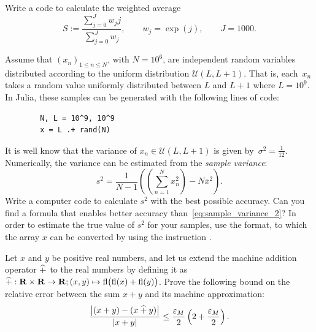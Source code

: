 \begin{exercise}
    Write a code to calculate the weighted average
    \[
        S := \frac
        {\sum_{j=0}^{J} w_j j}
        {\sum_{j=0}^{J} w_j},
        \qquad w_j = \exp(j),
        \qquad J = 1000.
    \]
\end{exercise}

\begin{exercise}
    Assume that $(x_n)_{1 \leq n \leq N}$, with $N = 10^6$, are independent random variables distributed according to
    the uniform distribution $\mathcal U(L, L+1)$.
    That is, each~$x_n$ takes a random value uniformly distributed between $L$ and $L+1$ where $L = 10^9$.
    In Julia, these samples can be generated with the following lines of code:
    \begin{verbatim}
        N, L = 10^9, 10^9
        x = L .+ rand(N)
    \end{verbatim}
    It is well know that the variance of $x_n \in \mathcal U(L, L+1)$ is given by~$\sigma^2 = \frac{1}{12}$.
    Numerically, the variance can be estimated from the \emph{sample variance}:
    \begin{equation}
        \label{eq:sample_variance_2}
        s^2 = \frac{1}{N-1} \left(\left(\sum_{n=1}^{N} x_n^2\right) - N \bar x^2 \right).
    \end{equation}
    Write a computer code to calculate $s^2$ with the best possible accuracy.
    Can you find a formula that enables better accuracy than~\eqref{eq:sample_variance_2}?
    In order to estimate the true value of $s^2$ for your samples,
    use the  format,
    to which the array $x$ can be converted by using the instruction .
\end{exercise}

\begin{exercise}
    Let $x$ and $y$ be positive real numbers,
    and let us extend the machine addition operator $\mathbin{\widehat +}$ to the real numbers by defining it as $\mathbin{\widehat +}: \mathbf R \times \mathbf R \to \mathbf R; (x, y) \mapsto {\rm fl} \bigl({\rm fl}(x) + {\rm fl}(y)\bigr)$.
    Prove the following bound on the relative error between the sum $x+y$ and its machine approximation:
    \[
        \frac{\bigl| (x + y) - (x \mathbin{\widehat +}  y ) \bigr|}{|x + y|}
        \leq \frac{\varepsilon_M}{2}  \left(2 + \frac{\varepsilon_M}{2}\right).
    \]
\end{exercise}


